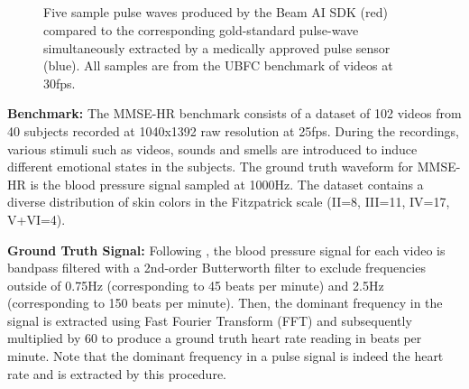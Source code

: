 \documentclass{article}
\begin{document}
\begin{figure}[t]
    \centering
     \\
    \vspace{-0.1in}
     \\
    \vspace{-0.1in}
     \\
    \vspace{-0.1in}
     \\
    \vspace{-0.1in}
    \caption{Five sample pulse waves produced by the Beam AI SDK (red) compared to the corresponding gold-standard pulse-wave simultaneously extracted by a medically approved pulse sensor (blue). All samples are from the UBFC \cite{Bobbia17_UBFC} benchmark of videos at 30fps.}
    \label{fig:ubfc-pulse-waves}
    \vspace{-0.25in}
\end{figure}


\textbf{Benchmark:} The MMSE-HR \cite{Zhang16_MMSE} benchmark consists of a dataset of 102 videos from 40 subjects recorded at 1040x1392 raw resolution at 25fps. During the recordings, various stimuli such as videos, sounds and smells are introduced to induce different emotional states in the subjects. The ground truth waveform for MMSE-HR is the blood pressure signal sampled at 1000Hz. The dataset contains a diverse distribution of skin colors in the Fitzpatrick scale (II=8, III=11, IV=17, V+VI=4).

\textbf{Ground Truth Signal:} Following \cite{EfficientPhys_Liu2021}, the blood pressure signal for each video is bandpass filtered with a 2nd-order Butterworth \cite{Selesnick96_Butterworth} filter to exclude frequencies outside of 0.75Hz (corresponding to 45 beats per minute) and 2.5Hz (corresponding to 150 beats per minute). Then, the dominant frequency in the signal is extracted using Fast Fourier Transform (FFT) \cite{Brigham67_FFT} and subsequently multiplied by 60 to produce a ground truth heart rate reading in beats per minute. Note that the dominant frequency in a pulse signal is indeed the heart rate and is extracted by this procedure.
\end{document}
